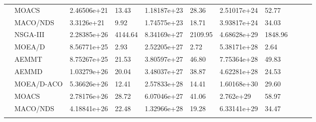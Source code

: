 \begin{sidewaystable}[]
\begin{tabular}{clV{5}l|lV{5}l|lV{5}l|l|}
		 & MOACS & 2.46506e+21 & 13.43 & 1.18187e+23 & 28.36 & 2.51017e+24 & 52.77\\ 
		 & MACO/NDS & 3.3126e+21 & 9.92 & 1.74575e+23 & 18.71 & 3.93817e+24 & 34.03\\ 
		 & NSGA-III & 2.28385e+26 & 4144.64 & 8.34169e+27 & 2109.95 & 4.68628e+29 & 1848.96\\ 
		 & MOEA/D & 8.56771e+25 & 2.93 & 2.52205e+27 & 2.72 & 5.38171e+28 & 2.64\\ 
		 & AEMMT & 8.75267e+25 & 21.53 & 3.80597e+27 & 46.80 & 7.75364e+28 & 49.83\\ 
		 & AEMMD & 1.03279e+26 & 20.04 & 3.48037e+27 & 38.87 & 4.62281e+28 & 24.53\\ 
		 & MOEA/D-ACO & 5.36626e+26 & 12.41 & 2.57833e+28 & 14.41 & 1.60168e+30 & 29.60\\ 
		 & MOACS & 2.78176e+26 & 28.72 & 6.07046e+27 & 41.06 & 2.762e+29 & 58.97\\ 
		 & MACO/NDS & 4.18841e+26 & 22.48 & 1.32966e+28 & 19.28 & 6.33141e+29 & 34.47\\ 
	\end{tabular}
\end{sidewaystable}

